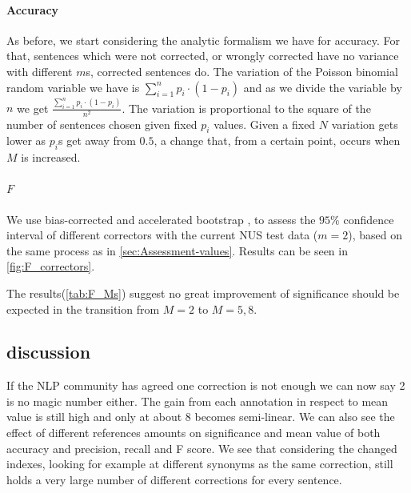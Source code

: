 \documentclass[english]{article}
\begin{document}
\paragraph{Accuracy}As before, we start considering the analytic formalism we have for accuracy. For that, sentences which were not corrected, or wrongly corrected have no variance with different $m$s, corrected sentences do. The variation of the Poisson binomial random variable we have is $\sum_{i=1}^{n}p_i\cdot\left(1-p_i\right)$ and as we divide the variable by $n$ we get $\frac{\sum_{i=1}^{n}p_i\cdot\left(1-p_i\right)}{n^2}$. 
The variation is proportional to the square of the number of sentences chosen given fixed $p_i$ values. Given a fixed $N$ variation gets lower as $p_i$s get away from $0.5$, a change that, from a certain point, occurs when $M$ is increased.

\paragraph{$F$}We use bias-corrected and accelerated bootstrap \cite{efron1987better}, to assess the $95\%$ confidence interval of different correctors with the current NUS test data ($m=2$), based on the same process as in \ref{sec:Assessment-values}. Results can be seen in \ref{fig:F_correctors}.

The results(\ref{tab:F_Ms}) suggest no great improvement of significance should be expected in the transition from $M=2$ to $M=5,8$.

\subsection{discussion}

If the NLP community has agreed one correction is not enough\cite{tetreault2008native}
we can now say 2 is no magic number either. The gain from each annotation in respect to mean value is still high and only at about 8 becomes semi-linear. We can also see the effect of different references amounts on significance and mean value of both accuracy and precision, recall and F score.
We see that considering the changed indexes, looking for example at different synonyms as the same correction, still holds a very large number of different corrections for every sentence.
\end{document}

